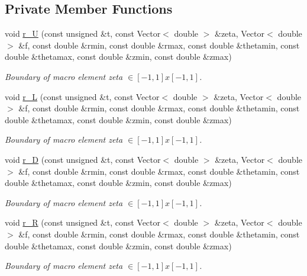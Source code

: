\subsection*{Private Member Functions}
\begin{DoxyCompactItemize}
\item 
void \hyperlink{classoomph_1_1QuarterPipeDomain_a5c023c7a9d6e43d123566bc2f7bb21f0}{r\+\_\+U} (const unsigned \&t, const Vector$<$ double $>$ \&zeta, Vector$<$ double $>$ \&f, const double \&rmin, const double \&rmax, const double \&thetamin, const double \&thetamax, const double \&zmin, const double \&zmax)
\begin{DoxyCompactList}\small\item\em Boundary of macro element zeta $ \in [-1,1]x[-1,1] $. \end{DoxyCompactList}\item 
void \hyperlink{classoomph_1_1QuarterPipeDomain_a21c58b76f546300c308d6e1f303a3433}{r\+\_\+L} (const unsigned \&t, const Vector$<$ double $>$ \&zeta, Vector$<$ double $>$ \&f, const double \&rmin, const double \&rmax, const double \&thetamin, const double \&thetamax, const double \&zmin, const double \&zmax)
\begin{DoxyCompactList}\small\item\em Boundary of macro element zeta $ \in [-1,1]x[-1,1] $. \end{DoxyCompactList}\item 
void \hyperlink{classoomph_1_1QuarterPipeDomain_aeb6e4d3fbb8afb4ad2597601f1a46afd}{r\+\_\+D} (const unsigned \&t, const Vector$<$ double $>$ \&zeta, Vector$<$ double $>$ \&f, const double \&rmin, const double \&rmax, const double \&thetamin, const double \&thetamax, const double \&zmin, const double \&zmax)
\begin{DoxyCompactList}\small\item\em Boundary of macro element zeta $ \in [-1,1]x[-1,1] $. \end{DoxyCompactList}\item 
void \hyperlink{classoomph_1_1QuarterPipeDomain_aab6f3fd79bc6dea1eb267f3b55630a2b}{r\+\_\+R} (const unsigned \&t, const Vector$<$ double $>$ \&zeta, Vector$<$ double $>$ \&f, const double \&rmin, const double \&rmax, const double \&thetamin, const double \&thetamax, const double \&zmin, const double \&zmax)
\begin{DoxyCompactList}\small\item\em Boundary of macro element zeta $ \in [-1,1]x[-1,1] $. \end{DoxyCompactList}\item 

\end{DoxyCompactItemize}

